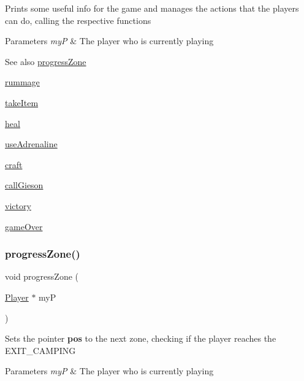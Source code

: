 Prints some useful info for the game and manages the actions that the players can do, calling the respective functions 
\begin{DoxyParams}{Parameters}
{\em myP} & The player who is currently playing\\
\hline
\end{DoxyParams}
\begin{DoxySeeAlso}{See also}
\hyperlink{group__game_ga60a90b03a3bbf68f9034843d5bbb59a6}{progress\+Zone} 

\hyperlink{group__game_ga63c1d1fc43a8568c5509c3616fefa14f}{rummage} 

\hyperlink{group__game_gaa6abddd4d89336e676f85cc4b5562101}{take\+Item} 

\hyperlink{group__game_ga95540730276b746fb5fae9061b50d3ad}{heal} 

\hyperlink{group__game_ga660302bc9e06f744f7492e364abeb37d}{use\+Adrenaline} 

\hyperlink{group__game_gada5c5b8cf9361720770a151aacfb961f}{craft} 

\hyperlink{group__game_gab3355c8ac255799fc0a453b3177afdf6}{call\+Gieson} 

\hyperlink{group__game_ga83efd39426fa23b683c9ac8edf60ac85}{victory} 

\hyperlink{group__game_ga17a56084a7a5dd2f21a5693387271249}{game\+Over} 
\end{DoxySeeAlso}
\mbox{\label{group__game_ga60a90b03a3bbf68f9034843d5bbb59a6}} 
\subsubsection{\texorpdfstring{progress\+Zone()}{progressZone()}}
{\footnotesize\ttfamily void progress\+Zone (\begin{DoxyParamCaption}\item[{\hyperlink{group__game_gac6f795d0d2e88ee469ddc704329e7cc3}{Player} $\ast$}]{myP }\end{DoxyParamCaption})\hspace{0.3cm}{\ttfamily [static]}}

Sets the pointer {\bfseries pos} to the next zone, checking if the player reaches the E\+X\+I\+T\+\_\+\+C\+A\+M\+P\+I\+NG 
\begin{DoxyParams}{Parameters}
{\em myP} & The player who is currently playing \\
\hline
\end{DoxyParams}
\mbox{\label{group__game_ga63c1d1fc43a8568c5509c3616fefa14f}} 

